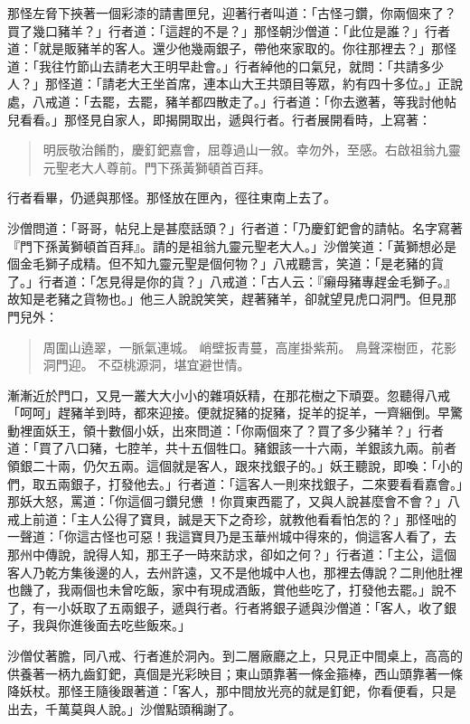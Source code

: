 那怪左脅下挾著一個彩漆的請書匣兒，迎著行者叫道：「古怪刁鑽，你兩個來了？買了幾口豬羊？」行者道：「這趕的不是？」那怪朝沙僧道：「此位是誰？」行者道：「就是販豬羊的客人。還少他幾兩銀子，帶他來家取的。你往那裡去？」那怪道：「我往竹節山去請老大王明早赴會。」行者綽他的口氣兒，就問：「共請多少人？」那怪道：「請老大王坐首席，連本山大王共頭目等眾，約有四十多位。」正說處，八戒道：「去罷，去罷，豬羊都四散走了。」行者道：「你去邀著，等我討他帖兒看看。」那怪見自家人，即揭開取出，遞與行者。行者展開看時，上寫著：
\begin{quote}
明辰敬治餚酌，慶釘鈀嘉會，屈尊過山一敘。幸勿外，至感。右啟祖翁九靈元聖老大人尊前。門下孫黃獅頓首百拜。
\end{quote}

行者看畢，仍遞與那怪。那怪放在匣內，徑往東南上去了。

沙僧問道：「哥哥，帖兒上是甚麼話頭？」行者道：「乃慶釘鈀會的請帖。名字寫著『門下孫黃獅頓首百拜』。請的是祖翁九靈元聖老大人。」沙僧笑道：「黃獅想必是個金毛獅子成精。但不知九靈元聖是個何物？」八戒聽言，笑道：「是老豬的貨了。」行者道：「怎見得是你的貨？」八戒道：「古人云：『癩母豬專趕金毛獅子。』故知是老豬之貨物也。」他三人說說笑笑，趕著豬羊，卻就望見虎口洞門。但見那門兒外：
\begin{quote}
周圍山遶翠，一脈氣連城。
峭壁扳青蔓，高崖掛紫荊。
鳥聲深樹匝，花影洞門迎。
不亞桃源洞，堪宜避世情。
\end{quote}

漸漸近於門口，又見一叢大大小小的雜項妖精，在那花樹之下頑耍。忽聽得八戒「呵呵」趕豬羊到時，都來迎接。便就捉豬的捉豬，捉羊的捉羊，一齊綑倒。早驚動裡面妖王，領十數個小妖，出來問道：「你兩個來了？買了多少豬羊？」行者道：「買了八口豬，七腔羊，共十五個牲口。豬銀該一十六兩，羊銀該九兩。前者領銀二十兩，仍欠五兩。這個就是客人，跟來找銀子的。」妖王聽說，即喚：「小的們，取五兩銀子，打發他去。」行者道：「這客人一則來找銀子，二來要看看嘉會。」那妖大怒，罵道：「你這個刁鑽兒憊𪬯！你買東西罷了，又與人說甚麼會不會？」八戒上前道：「主人公得了寶貝，誠是天下之奇珍，就教他看看怕怎的？」那怪咄的一聲道：「你這古怪也可惡！我這寶貝乃是玉華州城中得來的，倘這客人看了，去那州中傳說，說得人知，那王子一時來訪求，卻如之何？」行者道：「主公，這個客人乃乾方集後邊的人，去州許遠，又不是他城中人也，那裡去傳說？二則他肚裡也饑了，我兩個也未曾吃飯，家中有現成酒飯，賞他些吃了，打發他去罷。」說不了，有一小妖取了五兩銀子，遞與行者。行者將銀子遞與沙僧道：「客人，收了銀子，我與你進後面去吃些飯來。」

沙僧仗著膽，同八戒、行者進於洞內。到二層廠廳之上，只見正中間桌上，高高的供養著一柄九齒釘鈀，真個是光彩映目；東山頭靠著一條金箍棒，西山頭靠著一條降妖杖。那怪王隨後跟著道：「客人，那中間放光亮的就是釘鈀，你看便看，只是出去，千萬莫與人說。」沙僧點頭稱謝了。

